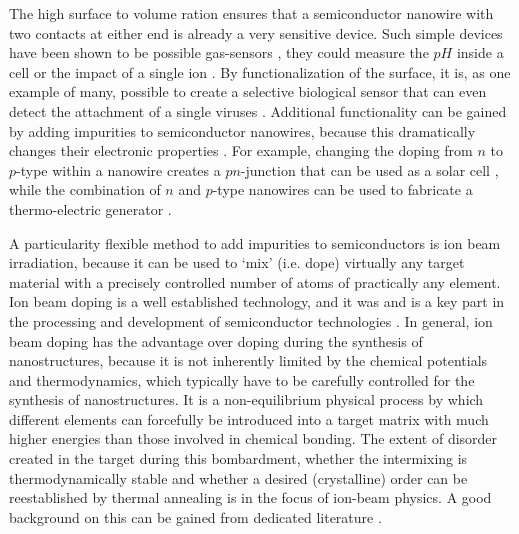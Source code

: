 The high surface to volume ration ensures that a semiconductor nanowire with two contacts at either end is already a very sensitive device. Such simple devices have been shown to be possible gas-sensors \cite{shen_devices_2009}, they could measure the $pH$ inside a cell \cite{cui_nanowire_2001} or the impact of a single ion \cite{johannes_persistent_2011}. By functionalization of the surface, it is, as one example of many, possible to create a selective biological sensor that can even detect the attachment of a single viruses \cite{patolsky_electrical_2004}. Additional functionality can be gained by adding impurities to semiconductor nanowires, because this dramatically changes their electronic properties \cite{sze_physics_2006}. For example, changing the doping from $n$ to $p$-type within a nanowire creates a $pn$-junction that can be used as a solar cell \cite{kempa_single_2008,christesen_design_2012}, while the combination of $n$ and $p$-type nanowires can be used to fabricate a thermo-electric generator \cite{schierning_silicon_2014}.

A particularity flexible method to add impurities to semiconductors is ion beam irradiation, because it can be used to `mix' (i.e. dope) virtually any target material with a precisely controlled number of atoms of practically any element. Ion beam doping is a well established technology, and it was and is a key part in the processing and development of semiconductor technologies \cite{hamm_industrial_2012}. In general, ion beam doping has the advantage over doping during the synthesis of nanostructures, because it is not inherently limited by the chemical potentials and thermodynamics, which typically have to be carefully controlled for the synthesis of nanostructures. It is a non-equilibrium physical process by which different elements can forcefully be introduced into a target matrix with much higher energies than those involved in chemical bonding. The extent of disorder created in the target during this bombardment, whether the intermixing is thermodynamically stable and whether a desired (crystalline) order can be reestablished by thermal annealing is in the focus of ion-beam physics. A good background on this can be gained from dedicated literature \cite{ziegler_stopping_1985,eckstein_computer_1991,nastasi/mayer/hirvonen_ion-solid_2008,schmidt_ion_2012}.



